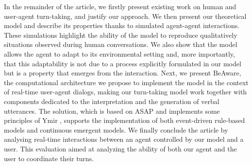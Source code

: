 
In the remainder of the article, we firstly present existing work on human and user-agent turn-taking, and justify our approach. 
We then present our theoretical model and describe its properties thanks to simulated agent-agent interactions. These simulations highlight the ability of the model to reproduce qualitatively situations observed during human conversations. 
We also show that the model allows the agent to adapt to its environmental setting and, more importantly, that this adaptability is not due to a process explicitly formulated in our model but is a property that emerges from the interaction. 
Next, we present BeAware, the computational architecture we propose to implement the model in the context of real-time user-agent dialogs, making our turn-taking model work together with components dedicated to the interpretation and the generation of verbal utterances. The solution, which is based on ASAP \cite{kopp_architecture_2014} and implements some principles of Ymir \cite{thorisson_mind_1999}, supports the implementation of both event-driven rule-based models and continuous emergent models. 
We finally conclude the article by analysing real-time interactions between an agent controlled by our model and a user. 
 This evaluation aimed at analyzing the ability of both our agent and the user to coordinate their turns. 
